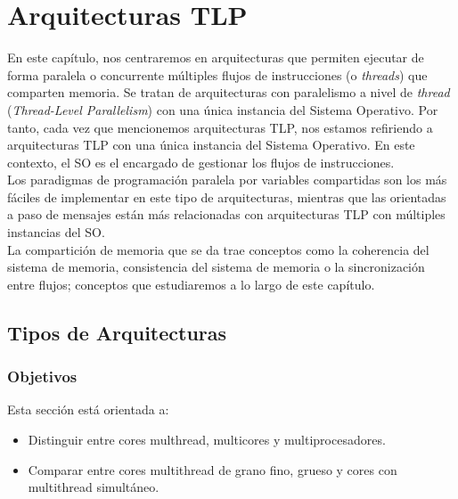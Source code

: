 \chapter{Arquitecturas TLP}
En este capítulo, nos centraremos en arquitecturas que permiten ejecutar de forma paralela o concurrente múltiples flujos de instrucciones (o \emph{threads}) que comparten memoria. Se tratan de arquitecturas con paralelismo a nivel de \emph{thread} (\emph{Thread-Level Parallelism}) con una única instancia del Sistema Operativo. Por tanto, cada vez que mencionemos arquitecturas TLP, nos estamos refiriendo a arquitecturas TLP con una única instancia del Sistema Operativo. En este contexto, el SO es el encargado de gestionar los flujos de instrucciones.\\

Los paradigmas de programación paralela por variables compartidas son los más fáciles de implementar en este tipo de arquitecturas, mientras que las orientadas a paso de mensajes están más relacionadas con arquitecturas TLP con múltiples instancias del SO\@.\\

La compartición de memoria que se da trae conceptos como la coherencia del sistema de memoria, consistencia del sistema de memoria o la sincronización entre flujos; conceptos que estudiaremos a lo largo de este capítulo.

\section{Tipos de Arquitecturas}
\subsection{Objetivos}
Esta sección está orientada a:
\begin{itemize}
    \item Distinguir entre cores multhread, multicores y multiprocesadores.
    \item Comparar entre cores multithread de grano fino, grueso y cores con multithread simultáneo.
\end{itemize}


